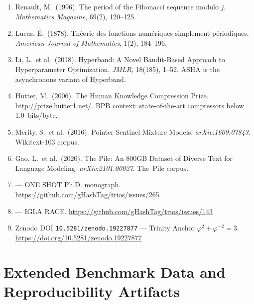 \begin{enumerate}
\item Renault, M.\ (1996). The period of the Fibonacci sequence
  modulo $j$.  \emph{Mathematics Magazine}, 69(2), 120--125.

\item Lucas, É.\ (1878). Théorie des fonctions numériques simplement
  périodiques.  \emph{American Journal of Mathematics}, 1(2), 184--196.

\item Li, L.\ et al.\ (2018). Hyperband: A Novel Bandit-Based Approach
  to Hyperparameter Optimization.  \emph{JMLR}, 18(185), 1--52.
  \label{ref:li2018hyperband}
  ASHA is the asynchronous variant of Hyperband.

\item Hutter, M.\ (2006). The Human Knowledge Compression Prize.
  \url{http://prize.hutter1.net/}.
  BPB context: state-of-the-art compressors below 1.0~bits/byte.

\item Merity, S.\ et al.\ (2016). Pointer Sentinel Mixture Models.
  \emph{arXiv:1609.07843}.  Wikitext-103 corpus.
  \label{ref:merity_wikitext_2016}

\item Gao, L.\ et al.\ (2020). The Pile: An 800GB Dataset of Diverse
  Text for Language Modeling.  \emph{arXiv:2101.00027}.
  The~Pile corpus.
  \label{ref:gao_pile_2020}

\item {} ---
  ONE SHOT Ph.D. monograph.
  \url{https://github.com/gHashTag/trios/issues/265}

\item {} ---
  IGLA RACE.
  \url{https://github.com/gHashTag/trios/issues/143}

\item Zenodo DOI \texttt{10.5281/zenodo.19227877} ---
  Trinity Anchor $\varphi^2 + \varphi^{-2} = 3$.
  \url{https://doi.org/10.5281/zenodo.19227877}
\end{enumerate}


\section{Extended Benchmark Data and Reproducibility Artifacts}
\label{sec:ch25-extended-data}

